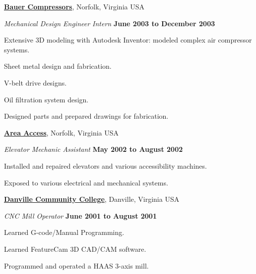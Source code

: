 \documentclass[10pt]{article}
\newenvironment{outerlist}[1][\enskip\textbullet]%
        {\begin{itemize}[#1]}{\end{itemize}%
         \vspace{-.6\baselineskip}}
\newenvironment{innerlist}[1][\enskip\textbullet]%
        {\begin{compactitem}[#1]}{\end{compactitem}}
\newcommand{\blankline}{\quad\pagebreak[2]}
\begin{document}
\blankline

\href{http://www.bauercomp.com/}{\textbf{Bauer Compressors}}, Norfolk, Virginia
USA
\begin{outerlist}
  \item[] \textit{Mechanical Design Engineer Intern}%
    \hfill \textbf{June 2003 to December 2003}
  \begin{innerlist}
    \item Extensive 3D modeling with Autodesk Inventor: modeled complex
        air compressor systems.
    \item Sheet metal design and fabrication.
    \item V-belt drive designs.
    \item Oil filtration system design.
    \item Designed parts and prepared drawings for fabrication.
  \end{innerlist}
\end{outerlist}

\blankline

\href{http://www.areaaccess.com/}{\textbf{Area Access}}, Norfolk, Virginia USA
\begin{outerlist}
  \item[] \textit{Elevator Mechanic Assistant}%
    \hfill \textbf{May 2002 to August 2002}
  \begin{innerlist}
    \item Installed and repaired elevators and various accessibility machines.
    \item Exposed to various electrical and mechanical systems.
  \end{innerlist}
\end{outerlist}

\blankline

\href{http://www.dcc.vccs.edu/}{\textbf{Danville Community College}}, Danville, Virginia USA
\begin{outerlist}
  \item[] \textit{CNC Mill Operator}%
    \hfill \textbf{June 2001 to August 2001}
  \begin{innerlist}
    \item Learned G-code/Manual Programming.
    \item Learned FeatureCam 3D CAD/CAM software.
    \item Programmed and operated a HAAS 3-axis mill.
  \end{innerlist}
\end{outerlist}
\end{document}
